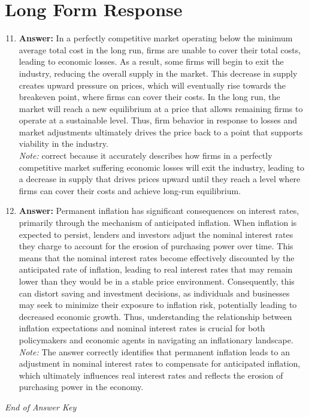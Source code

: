 \documentclass[12pt]{article}
\begin{document}
\section*{Long Form Response}
\begin{enumerate}[label=\arabic*.]
\setcounter{enumi}{10}
\item \textbf{Answer:} In a perfectly competitive market operating below the minimum average total cost in the long run, firms are unable to cover their total costs, leading to economic losses. As a result, some firms will begin to exit the industry, reducing the overall supply in the market. This decrease in supply creates upward pressure on prices, which will eventually rise towards the breakeven point, where firms can cover their costs. In the long run, the market will reach a new equilibrium at a price that allows remaining firms to operate at a sustainable level. Thus, firm behavior in response to losses and market adjustments ultimately drives the price back to a point that supports viability in the industry.
\\ \textit{Note:} correct because it accurately describes how firms in a perfectly competitive market suffering economic losses will exit the industry, leading to a decrease in supply that drives prices upward until they reach a level where firms can cover their costs and achieve long-run equilibrium.
\item \textbf{Answer:} Permanent inflation has significant consequences on interest rates, primarily through the mechanism of anticipated inflation. When inflation is expected to persist, lenders and investors adjust the nominal interest rates they charge to account for the erosion of purchasing power over time. This means that the nominal interest rates become effectively discounted by the anticipated rate of inflation, leading to real interest rates that may remain lower than they would be in a stable price environment. Consequently, this can distort saving and investment decisions, as individuals and businesses may seek to minimize their exposure to inflation risk, potentially leading to decreased economic growth. Thus, understanding the relationship between inflation expectations and nominal interest rates is crucial for both policymakers and economic agents in navigating an inflationary landscape.
\\ \textit{Note:} The answer correctly identifies that permanent inflation leads to an adjustment in nominal interest rates to compensate for anticipated inflation, which ultimately influences real interest rates and reflects the erosion of purchasing power in the economy.
\end{enumerate}

\vfill
\noindent\textit{End of Answer Key}
\end{document}
